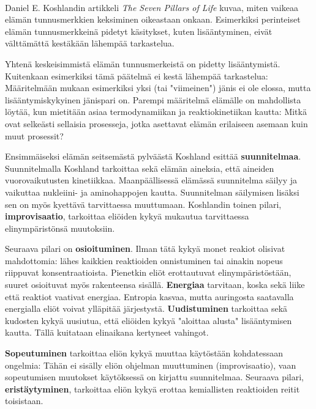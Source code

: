 \documentclass[a4paper,10pt]{scrartcl}
\author{Sakari Cajanus}
\begin{document}
\pagestyle{fancy}
\begin{center}
\Large\textsc{\theround}\\\normalsize
\end{center}
Daniel E. Koshlandin artikkeli \emph{The Seven Pillars of Life} kuvaa, miten
vaikeaa elämän tunnusmerkkien keksiminen oikeastaan onkaan. Esimerkiksi
perinteiset elämän tunnusmerkkeinä pidetyt käsitykset, kuten lisääntyminen,
eivät välttämättä kestäkään lähempää tarkastelua.

Yhtenä keskeisimmistä elämän tunnusmerkeistä on pidetty lisääntymistä.
Kuitenkaan esimerkiksi tämä päätelmä ei kestä lähempää tarkastelua:
Määritelmään mukaan esimerkiksi yksi (tai "viimeinen") jänis ei ole elossa,
mutta lisääntymiskykyinen jänispari on. Parempi määritelmä elämälle on
mahdollista löytää, kun mietitään asiaa termodynamiikan ja reaktiokinetiikan
kautta: Mitkä ovat selkeästi sellaisia prosesseja, jotka asettavat elämän
erilaiseen asemaan kuin muut prosessit?

Ensimmäiseksi elämän seitsemästä pylväästä Koshland esittää
\textbf{suunnitelmaa}. Suunnitelmalla Koshland tarkoittaa sekä elämän
aineksia, että aineiden vuorovaikutusten kinetiikkaa. Maanpäällisessä
elämässä suunnitelma säilyy ja vaikuttaa nukleiini- ja aminohappojen kautta.
Suunnitelman säilymisen lisäksi sen on myös kyettävä tarvittaessa muuttumaan.
Koshlandin toinen pilari, \textbf{improvisaatio}, tarkoittaa eliöiden kykyä
mukautua tarvittaessa elinympäristönsä muutoksiin.

Seuraava pilari on \textbf{osioituminen}. Ilman tätä kykyä monet reakiot
olisivat mahdottomia: lähes kaikkien reaktioiden onnistuminen tai ainakin
nopeus riippuvat konsentraatioista. Pienetkin eliöt erottautuvat
elinympäristöstään, suuret osioituvat myös rakenteensa sisällä.
\textbf{Energiaa} tarvitaan, koska sekä liike että reaktiot vaativat
energiaa. Entropia kasvaa, mutta auringosta saatavalla energialla eliöt
voivat ylläpitää järjestystä.  \textbf{Uudistuminen} tarkoittaa sekä kudosten
kykyä uusiutua, että eliöiden kykyä "aloittaa alusta" lisääntymisen kautta.
Tällä kuitataan elinaikana kertyneet vahingot.

\textbf{Sopeutuminen} tarkoittaa eliön kykyä muuttaa käytöstään kohdatessaan
ongelmia: Tähän ei sisälly eliön ohjelman muuttuminen (improvisaatio), vaan
sopeutumisen muutokset käytöksessä on kirjattu suunnitelmaa. Seuraava pilari,
\textbf{eristäytyminen}, tarkoittaa eliön kykyä erottaa kemiallisten
reaktioiden reitit toisistaan.
\end{document}

